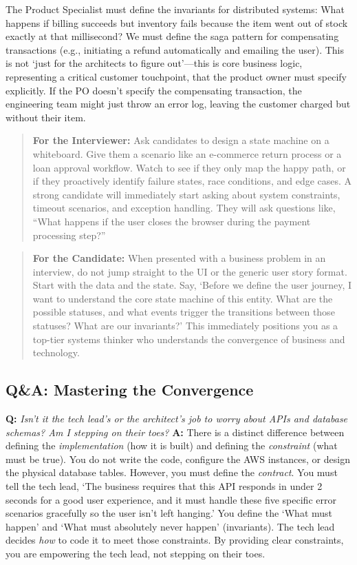 The Product Specialist must define the invariants for distributed
systems: What happens if billing succeeds but inventory fails because
the item went out of stock exactly at that millisecond? We must define
the saga pattern for compensating transactions (e.g., initiating a
refund automatically and emailing the user). This is not `just for the
architects to figure out'---this is core business logic, representing a
critical customer touchpoint, that the product owner must specify
explicitly. If the PO doesn't specify the compensating transaction, the
engineering team might just throw an error log, leaving the customer
charged but without their item.

\begin{quote}
\textbf{For the Interviewer:} Ask candidates to design a state machine
on a whiteboard. Give them a scenario like an e-commerce return process
or a loan approval workflow. Watch to see if they only map the happy
path, or if they proactively identify failure states, race conditions,
and edge cases. A strong candidate will immediately start asking about
system constraints, timeout scenarios, and exception handling. They will
ask questions like, ``What happens if the user closes the browser during
the payment processing step?''
\end{quote}

\begin{quote}
\textbf{For the Candidate:} When presented with a business problem in an
interview, do not jump straight to the UI or the generic user story
format. Start with the data and the state. Say, `Before we define the
user journey, I want to understand the core state machine of this
entity. What are the possible statuses, and what events trigger the
transitions between those statuses? What are our invariants?' This
immediately positions you as a top-tier systems thinker who understands
the convergence of business and technology.
\end{quote}

\subsection{Q\&A: Mastering the
Convergence}\label{qa-mastering-the-convergence}

\textbf{Q:} \emph{Isn't it the tech lead's or the architect's job to
worry about APIs and database schemas? Am I stepping on their toes?}
\textbf{A:} There is a distinct difference between defining the
\emph{implementation} (how it is built) and defining the
\emph{constraint} (what must be true). You do not write the code,
configure the AWS instances, or design the physical database tables.
However, you must define the \emph{contract}. You must tell the tech
lead, `The business requires that this API responds in under 2 seconds
for a good user experience, and it must handle these five specific error
scenarios gracefully so the user isn't left hanging.' You define the
`What must happen' and `What must absolutely never happen' (invariants).
The tech lead decides \emph{how} to code it to meet those constraints.
By providing clear constraints, you are empowering the tech lead, not
stepping on their toes.

